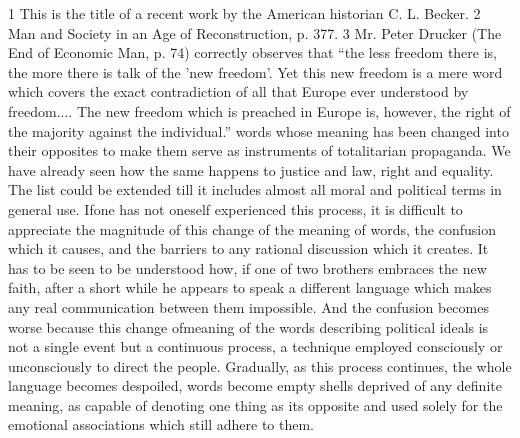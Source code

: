 \documentclass[11pt,openany]{book}
\begin{document}
1 This is the title of a recent work by the American historian C. L. Becker. 2 Man and Society in an Age of Reconstruction, p. 377. 3 Mr. Peter Drucker (The End of Economic Man, p. 74) correctly observes that ``the less freedom there is, the more there is talk of the 'new freedom'. Yet this new freedom is a mere word which covers the exact contradiction of all that Europe ever understood by freedom.... The new freedom which is preached in Europe is, however, the right of the majority against the individual.'' words whose meaning has been changed into their opposites to make them serve as instruments of totalitarian propaganda. We have already seen how the same happens to justice and law, right and equality. The list could be extended till it includes almost all moral and political terms in general use. Ifone has not oneself experienced this process, it is difficult to appreciate the magnitude of this change of the meaning of words, the confusion which it causes, and the barriers to any rational discussion which it creates. It has to be seen to be understood how, if one of two brothers embraces the new faith, after a short while he appears to speak a different language which makes any real communication between them impossible. And the confusion becomes worse because this change ofmeaning of the words describing political ideals is not a single event but a continuous process, a technique employed consciously or unconsciously to direct the people. Gradually, as this process continues, the whole language becomes despoiled, words become empty shells deprived of any definite meaning, as capable of denoting one thing as its opposite and used solely for the emotional associations which still adhere to them.

\begin{center}\textasteriskcentered\hspace{0.9em}\textasteriskcentered\hspace{0.9em}\textasteriskcentered\end{center}

\begin{center}\textasteriskcentered\hspace{0.9em}\textasteriskcentered\hspace{0.9em}\textasteriskcentered\end{center}

\begin{center}\textasteriskcentered\hspace{0.9em}\textasteriskcentered\hspace{0.9em}\textasteriskcentered\end{center}
\end{document}
